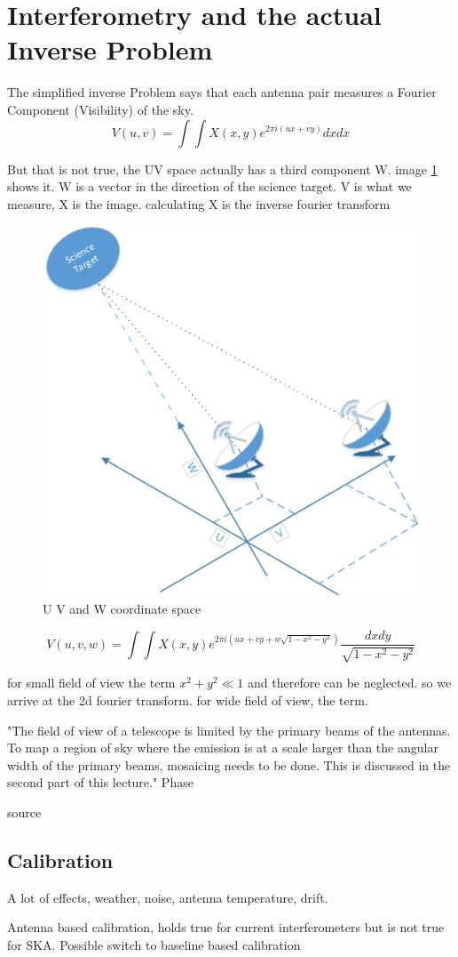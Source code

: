 \section{Interferometry and the actual Inverse Problem} \label{radio}

The simplified inverse Problem says that each antenna pair measures a Fourier Component (Visibility) of the sky. 
\begin{equation}\label{radio:eq:2dft}
V(u, v) = \int\int X(x, y) e^{2 \pi i (ux+vy)} dx dx
\end{equation}

But that is not true, the UV space actually has a third component W. image \ref{radio:uvw} shows it. W is a vector in the direction of the science target.
V is what we measure, X is the image. calculating X is the inverse fourier transform

\begin{figure}[h!] 
	\centering
	\includegraphics[width=0.6\linewidth]{./chapters/03.radio/uvw.png}
	\caption{U V and W coordinate space}
	\label{radio:uvw}
\end{figure}

\begin{equation}\label{radio:eq:ft}
V(u, v, w) = \int\int X(x, y) e^{2 \pi i (ux+vy+ w\sqrt{1 - x^2 - y ^2})} \frac{dx dy}{\sqrt{1 - x^2 - y ^2}}
\end{equation}

for small field of view the term  $x^2 + y^2 \ll 1$ and therefore can be neglected. so we arrive at the 2d fourier transform. for wide field of view, the term.

"The field of view of a telescope is limited by the primary beams of the antennas. To map a region of sky where the emission is at a scale larger than the angular width of the primary beams, mosaicing needs to be done. This is discussed in the second part of this lecture."
Phase 

source \cite{lfraSchool}


\subsection{Calibration}
A lot of effects, weather, noise, antenna temperature, drift.

Antenna based calibration, holds true for current interferometers but is not true for SKA. Possible switch to baseline based calibration
